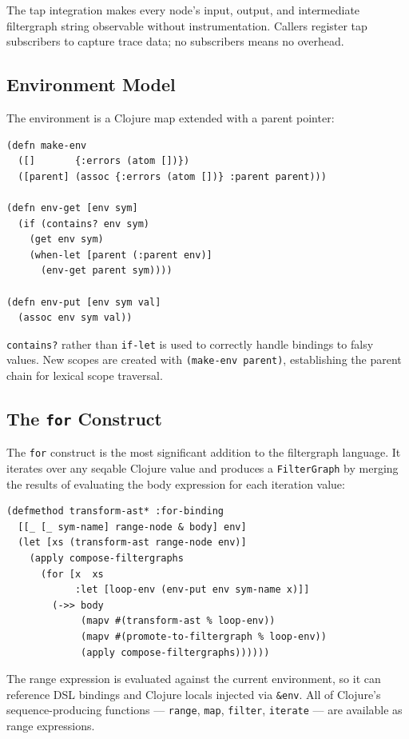 \documentclass[conference]{IEEEtran}
\begin{document}
The tap integration makes every node's input, output, and intermediate filtergraph string observable without instrumentation. Callers register tap subscribers to capture trace data; no subscribers means no overhead.

\subsection{Environment Model}

The environment is a Clojure map extended with a parent pointer:

\begin{lstlisting}[caption={Environment operations}]
(defn make-env
  ([]       {:errors (atom [])})
  ([parent] (assoc {:errors (atom [])} :parent parent)))

(defn env-get [env sym]
  (if (contains? env sym)
    (get env sym)
    (when-let [parent (:parent env)]
      (env-get parent sym))))

(defn env-put [env sym val]
  (assoc env sym val))
\end{lstlisting}

\texttt{contains?} rather than \texttt{if-let} is used to correctly handle bindings to falsy values. New scopes are created with \texttt{(make-env parent)}, establishing the parent chain for lexical scope traversal.

\subsection{The \texttt{for} Construct}

The \texttt{for} construct is the most significant addition to the filtergraph language. It iterates over any seqable Clojure value and produces a \texttt{FilterGraph} by merging the results of evaluating the body expression for each iteration value:

\begin{lstlisting}[caption={for-binding evaluation}]
(defmethod transform-ast* :for-binding
  [[_ [_ sym-name] range-node & body] env]
  (let [xs (transform-ast range-node env)]
    (apply compose-filtergraphs
      (for [x  xs
            :let [loop-env (env-put env sym-name x)]]
        (->> body
             (mapv #(transform-ast % loop-env))
             (mapv #(promote-to-filtergraph % loop-env))
             (apply compose-filtergraphs))))))
\end{lstlisting}

The range expression is evaluated against the current environment, so it can reference DSL bindings and Clojure locals injected via \texttt{\&env}. All of Clojure's sequence-producing functions --- \texttt{range}, \texttt{map}, \texttt{filter}, \texttt{iterate} --- are available as range expressions.
\end{document}
